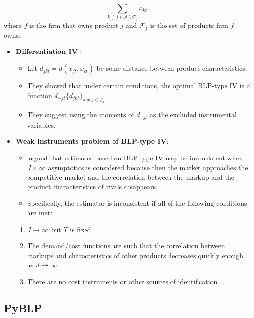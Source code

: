\documentclass[
]{book}
\providecommand{\tightlist}{%
  \setlength{\itemsep}{0pt}\setlength{\parskip}{0pt}}
\begin{document}
\begin{equation}
\sum_{k \neq j \in \mathcal{J}_t \setminus \mathcal{F}_{f}} x_{kt}.
\end{equation}
where \(f\) is the firm that owns product \(j\) and \(\mathcal{F}_{f}\) is the set of products firm \(f\) owns.

\begin{itemize}
\tightlist
\item
  \textbf{Differentiation IV} \citep{Gandhi2015a}:

  \begin{itemize}
  \tightlist
  \item
    Let \(d_{jkt} = d(x_{jt}, x_{kt})\) be some distance between product characteristics.
  \item
    They showed that under certain conditions, the optimal BLP-type IV is a function \(d_{-jt}\{d_{jkt}\}_{k \neq j \in \mathcal{J}_t}\).
  \item
    They suggest using the moments of \(d_{-jt}\) as the excluded instrumental variables.
  \end{itemize}
\item
  \textbf{Weak instruments problem of BLP-type IV}:

  \begin{itemize}
  \tightlist
  \item
    \citet{Armstrong2016b} argued that estimates based on BLP-type IV may be inconsistent when \(J \times \infty\) asymptotics is considered because then the market approaches the competitive market and the correlation between the markup and the product characteristics of rivals disappears.
  \item
    Specifically, the estimator is inconsistent if all of the following conditions are met:
  \end{itemize}

  \begin{enumerate}
  \def\labelenumi{\arabic{enumi}.}
  \tightlist
  \item
    \(J \to \infty\) but \(T\) is fixed
  \item
    The demand/cost functions are such that the correlation between markups and characteristics of other products decreases quickly enough as \(J \to \infty\)
  \item
    There are no cost instruments or other sources of identification
  \end{enumerate}
\end{itemize}

\hypertarget{pyblp}{%
\subsection{PyBLP}\label{pyblp}}
\end{document}
